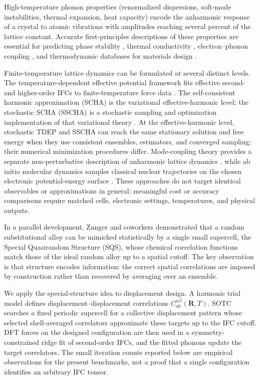 \documentclass[aps,prb,reprint,amsmath,amssymb,floatfix]{revtex4-2}
\begin{document}
High-temperature phonon properties (renormalized dispersions, soft-mode
instabilities, thermal expansion, heat capacity) encode the anharmonic
response of a crystal to atomic vibrations with amplitudes reaching
several percent of the lattice constant. Accurate first-principles
descriptions of these properties are essential for predicting phase
stability \cite{ref1}, thermal conductivity \cite{ref2},
electron--phonon coupling \cite{ref3}, and thermodynamic databases for
materials design \cite{ref4}.

Finite-temperature lattice dynamics can be formulated at several distinct
levels. The temperature-dependent effective potential framework fits effective
second- and higher-order IFCs to finite-temperature force data
\cite{ref5,ref6,ref10,ref52}. The self-consistent harmonic approximation (SCHA)
is the variational effective-harmonic level; the stochastic SCHA (SSCHA) is a
stochastic sampling and optimization implementation of that variational theory
\cite{ref7,ref8,ref50}. At the effective-harmonic level, stochastic TDEP and
SSCHA can reach the same stationary solution and free energy when they use
consistent ensembles, estimators, and converged sampling; their numerical
minimization procedures differ. Mode-coupling theory provides a separate
non-perturbative description of anharmonic lattice dynamics \cite{ref51}, while
ab initio molecular dynamics samples classical nuclear trajectories on the
chosen electronic potential-energy surface \cite{ref9}. These approaches do not
target identical observables or approximations in general; meaningful cost or
accuracy comparisons require matched cells, electronic settings, temperatures,
and physical outputs.

In a parallel development, Zunger and coworkers \cite{ref12}
demonstrated that a random substitutional alloy can be mimicked
statistically by a single small supercell, the Special Quasirandom
Structure (SQS), whose chemical correlation functions match those of the
ideal random alloy up to a spatial cutoff. The key observation is that
structure encodes information: the correct spatial correlations are
imposed by construction rather than recovered by averaging over an
ensemble.

We apply the special-structure idea to displacement design. A harmonic trial
model defines displacement--displacement correlations
\(C_{ab}^{\alpha\beta}(\mathbf R,T)\). SOTC searches a fixed periodic
supercell for a collective displacement pattern whose selected shell-averaged
correlators approximate these targets up to the IFC cutoff. DFT forces on the
designed configuration are then used in a symmetry-constrained ridge fit of
second-order IFCs, and the fitted phonons update the target correlators. The
small iteration counts reported below are empirical observations for the
present benchmarks, not a proof that a single configuration identifies an
arbitrary IFC tensor.
\end{document}
